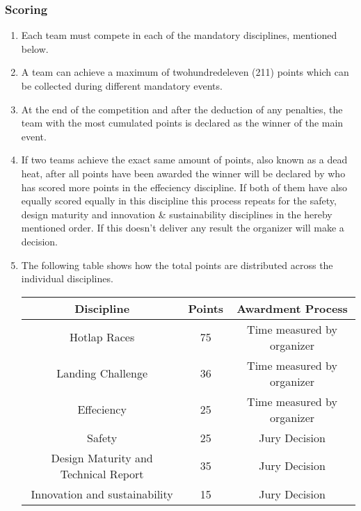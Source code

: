     \subsubsection{Scoring}
    \begin{enumerate}
      \item Each team must compete in each of the mandatory disciplines, mentioned below. 
      \item A team can achieve a maximum of twohundredeleven (211) points which can be collected during different mandatory events.
      \item At the end of the competition and after the deduction of any penalties, the team with the most cumulated points is declared as the winner of the main event. 
      \item If two teams achieve the exact same amount of points, also known as a dead heat, after all points have been awarded the winner will be declared by who has scored more points in the effeciency discipline. 
      If both of them have also equally scored equally in this discipline this process repeats for the safety, design maturity and innovation \& sustainability disciplines in the hereby mentioned order. If this doesn't deliver any result the organizer will make a decision. 
      \item The following table shows how the total points are distributed across the individual disciplines. 

      \begin{center}
        \begin{tabular}{|c|c|c|} 
          \hline
          Discipline & Points & Awardment Process \\ 
          \hline
          Hotlap Races & 75 & Time measured by organizer \\ 
          \hline
          Landing Challenge & 36 & Time measured by organizer \\ 
          \hline
          Effeciency & 25 & Time measured by organizer \\ 
          \hline
          Safety & 25 & Jury Decision \\ 
          \hline
          Design Maturity and Technical Report & 35 & Jury Decision \\ 
          \hline
          Innovation and sustainability & 15 & Jury Decision \\ 
          \hline
        \end{tabular}
      \end{center}
    \end{enumerate}

